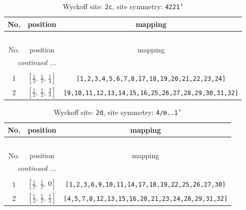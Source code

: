 \documentclass[fleqn,8pt]{jsarticle}
\begin{document}
\renewcommand{\arraystretch}{1.2}
\begin{longtable}{ccc}
\caption{Wyckoff site: {\tt 2c}, site symmetry: {\tt 4221'}}
 \\
 \hline \hline
No. & position & mapping \\ \hline \endfirsthead

\multicolumn{2}{l}{\tablename\ \thetable{}} \\
 \hline \hline
No. & position & mapping \\ \hline \endhead

 \hline \hline
\multicolumn{2}{r}{\footnotesize\it continued ...} \\ \endfoot

 \hline \hline
\multicolumn{2}{r}{} \\ \endlastfoot

1 & $\left[ \frac{1}{2},\, \frac{1}{2},\, \frac{1}{4} \right]$ & {\tt [1,2,3,4,5,6,7,8,17,18,19,20,21,22,23,24]} \\ \hline
2 & $\left[ \frac{1}{2},\, \frac{1}{2},\, \frac{3}{4} \right]$ & {\tt [9,10,11,12,13,14,15,16,25,26,27,28,29,30,31,32]} \\
\end{longtable}
\renewcommand{\arraystretch}{1.2}
\begin{longtable}{ccc}
\caption{Wyckoff site: {\tt 2d}, site symmetry: {\tt 4/m..1'}}
 \\
 \hline \hline
No. & position & mapping \\ \hline \endfirsthead

\multicolumn{2}{l}{\tablename\ \thetable{}} \\
 \hline \hline
No. & position & mapping \\ \hline \endhead

 \hline \hline
\multicolumn{2}{r}{\footnotesize\it continued ...} \\ \endfoot

 \hline \hline
\multicolumn{2}{r}{} \\ \endlastfoot

1 & $\left[ \frac{1}{2},\, \frac{1}{2},\, 0 \right]$ & {\tt [1,2,3,6,9,10,11,14,17,18,19,22,25,26,27,30]} \\ \hline
2 & $\left[ \frac{1}{2},\, \frac{1}{2},\, \frac{1}{2} \right]$ & {\tt [4,5,7,8,12,13,15,16,20,21,23,24,28,29,31,32]} \\
\end{longtable}
\renewcommand{\arraystretch}{1.2}
\end{document}
